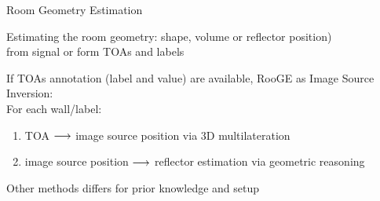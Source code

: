\begin{frame}[t]{Room Geometry Estimation}

    \begin{block}{}
        Estimating the room geometry: shape, volume or reflector position)
        \\from signal or form TOAs and labels
    \end{block}
    \vfill

    \begin{block}{}
        If TOAs annotation (label and value) are available, RooGE as \alert{Image Source Inversion}:
        \\For each wall/label:
        \begin{enumerate}
            \item TOA $\longrightarrow$ image source position via 3D multilateration
            \item image source position $\longrightarrow$ reflector estimation via geometric reasoning
        \end{enumerate}
    \end{block}

    \vfill
    Other methods differs for prior knowledge and setup~\cite{Crocco,Antonacci,Filos}

    \vfill

\end{frame}

